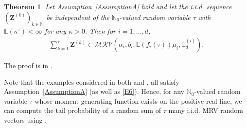 \documentclass[aos]{imsart}
\numberwithin{equation}{section}
\theoremstyle{plain} %
\newtheorem{theorem}{Theorem}[section]
\theoremstyle{remark}
\newtheorem{remark}[theorem]{Remark}
\newcommand{\beao}{\begin{eqnarray*}}
\newcommand{\eeao}{\end{eqnarray*}\noindent}
\newcommand{\E}{\mathbb{E}}
\newcommand{\N}{\mathbb{N}}
\renewcommand\P{\mathbb{P}}
\newcommand{\VF}[1]{{\color{blue} #1}}
\def\MRV{\mathcal{MRV}}
\def\bZ{\boldsymbol Z}
\newcommand{\DAS}[1]{{\color{red} #1}}
\begin{document}
\begin{theorem} \label{thm:randomsum:main}
Let Assumption~\ref{AssumptionA} hold and {let the i.i.d. sequence}
 $(\bZ^{(k)})_{k\in\N}$ be independent of the $\N_0$-valued random variable $\tau$ with $\E(\kappa^\tau)<\infty$ for any $\kappa>0$.
Then for $i=1,\ldots,d$,
\beao
   \sum_{k=1}^{\tau}\bZ^{(k)}\in \MRV(\alpha_i,b_i,\E(f_i(\tau))\mu_i,\E_d^{(i)}).
\eeao
\end{theorem}
The proof is in .

Note that the examples considered in both  and , all satisfy Assumption~\ref{AssumptionA} (as well as \eqref{E6}).  Hence, for any $\N_0$-valued random variable $\tau$ whose  moment generating function exists on the positive real line, we can compute the tail probability of a random sum of $\tau$ many i.i.d. MRV random vectors using .


\end{document}
